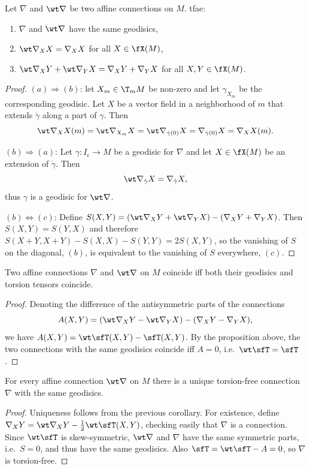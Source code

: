 \begin{prop}\label{prop geodisics coincide}
    Let $\nabla$ and $\wt\nabla$ be two affine connections on $M$. \gls{tfae}:
    \begin{enumerate}[label=(\alph*)]
        \item $\nabla$ and $\wt\nabla$ have the same geodisics,
        \item $\wt\nabla_X X=\nabla_X X$ for all $X\in\fX(M)$,
        \item $\wt\nabla_X Y+\wt\nabla_Y X=\nabla_X Y+\nabla_Y X$ for all $X,Y\in\fX(M)$.
    \end{enumerate}
\end{prop}
\begin{proof}
    $(a)\Rightarrow(b)$: let $X_m\in \T_mM$ be non-zero and let $\gamma_{X_m}$ be the corresponding geodisic. Let $X$ be a vector field in a neighborhood of $m$ that extends $\dot\gamma$ along a part of $\gamma$. Then 
    \[\wt\nabla_{X} X(m)=\wt\nabla_{X_m} X=\wt\nabla_{\dot\gamma(0)}X=\nabla_{\dot\gamma(0)}X=\nabla_X X(m).\]


    $(b)\Rightarrow(a)$: Let $\gamma:I_\epsilon\to M$ be a geodisic for $\nabla$ and let $X\in\fX(M)$ be an extension of $\dot\gamma$. Then 
    \[\wt\nabla_{\dot\gamma} X=\nabla_{\dot\gamma}X,\]
    thus $\gamma$ is a geodisic for $\wt\nabla$.

    $(b)\Leftrightarrow(c)$: Define $S(X,Y)=(\wt\nabla_X Y+\wt\nabla_Y X)-(\nabla_X Y+\nabla_Y X)$. Then $S(X,Y)=S(Y,X)$ and therefore $S(X+Y,X+Y)-S(X,X)-S(Y,Y)=2S(X,Y)$, so the vanishing of $S$ on the diagonal, $(b)$, is equivalent to the vanishing of $S$ everywhere, $(c)$.
\end{proof}
\begin{cor}
    Two affine connections $\nabla$ and $\wt\nabla$ on $M$ coincide iff both their geodisics and torsion tensors coincide.
\end{cor}
\begin{proof}
    Denoting the difference of the antisymmetric parts of the connections 
    \[A(X,Y)=(\wt\nabla_X Y-\wt\nabla_Y X)-(\nabla_X Y-\nabla_Y X),\]
    we have $A(X,Y)=\wt\sfT(X,Y)-\sfT(X,Y)$. By the proposition above, the two connections with the same geodisics coincide iff $A=0$, i.e.\ $\wt\sfT=\sfT$.
\end{proof}
\begin{cor}
    For every affine connection $\wt\nabla$ on $M$ there is a unique torsion-free connection $\nabla$ with the same geodisics.
\end{cor}
\begin{proof}
    Uniqueness follows from the previous corollary. For existence, define $\nabla_X Y=\wt\nabla_X Y-\frac12\wt\sfT(X,Y)$, checking easily that $\nabla$ is a connection. Since $\wt\sfT$ is skew-symmetric, $\wt\nabla$ and $\nabla$ have the same symmetric parts, i.e.\ $S=0$, and thus have the same geodisics. Also $\sfT=\wt \sfT-A=0$, so $\nabla$ is torsion-free.
\end{proof}

